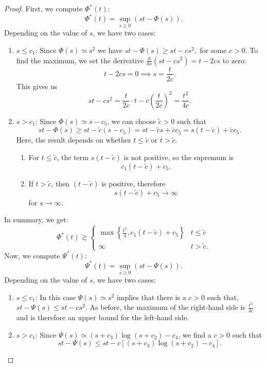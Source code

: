\documentclass[a4paper,11pt]{amsart}
\numberwithin{equation}{section}
\begin{document}
	\begin{proof}
		First, we compute $\Phi^*(t)$:
		$$
		\Phi^*(t) = \sup_{s \geq 0} \left( st - \Phi(s) \right).
		$$
		Depending on the value of $s$, we have two cases:
		\begin{enumerate}
			\item  $s \leq c_1$:
			Since $
			\Phi(s) \simeq s^2$ we have $ st - \Phi(s) \geq st - cs^2,
			$
			for some $c>0$.
			To find the maximum, we set the derivative $\frac{\mathrm{d}}{\mathrm{d}s}(st - cs^2) = t - 2cs$ to zero:
			$$
			t - 2cs = 0 \implies s = \frac{t}{2c}.
			$$
			This gives us
			$$
			st - c s^2 = \frac{t}{2c} \cdot t - c\left(\frac{t}{2c}\right)^2 = \frac{t^2}{4c}.
			$$
			\item $s > c_1$: Since $\Phi(s)  \simeq s - c_5$, we can choose $\tilde{c}>0$ such that $$st - \Phi(s) \geq st - \tilde{c}(s - c_5) = st - \tilde{c}s + \tilde{c}c_5 = s(t-\tilde{c}) + \tilde{c}c_5.$$
			Here, the result depends on whether $t \leq \tilde{c}$ or $t > \tilde{c}$.
			\begin{enumerate}
				\item For $t \leq \tilde{c}$, the term $s(t-\tilde{c})$ is not positive, so the supremum is
				$$
				c_1(t-\tilde{c}) + c_5.
				$$
				\item If $t>\tilde{c}$, then $(t-\tilde{c})$ is positive, therefore $$s(t-\tilde{c})+c_5 \to \infty$$ 
				for $s \to \infty$.
			\end{enumerate}
		\end{enumerate}
		In summary, we get:
		$$
		\Phi^*(t) \gtrsim \begin{cases}
			\max \left\{ \frac{t^2}{4}, c_1(t-\tilde{c})+c_5 \right\} & t \leq \tilde{c} \\
			\infty & t > \tilde{c}.
		\end{cases}
		$$
		Now, we compute $\Psi^*(t)$:
		$$
		\Psi^*(t) = \sup_{s \geq 0} \left( st - \Psi(s) \right).
		$$
		Depending on the value of $s$, we have two cases:
		\begin{enumerate}
			\item $s \leq c_1$:
			In this case $
			\Psi(s) \simeq s^2$ implies that there is a $c>0$ such that, $st - \Psi(s) \leq st - cs^2.$
			As before, the maximum of the right-hand side is
			$\frac{t^2}{4c}
			$
			and is therefore an upper bound for the left-hand side.
			\item $s > c_1$:
			Since 
			$\Psi(s)  \simeq (s+c_3) \log(s+c_2) - c_4$, we find a $c>0$ such that $$st - \Psi(s) \leq st - c\left[(s+c_3) \log(s+c_2) - c_4\right].
			$$

\end{enumerate}
\end{proof}
\end{document}
